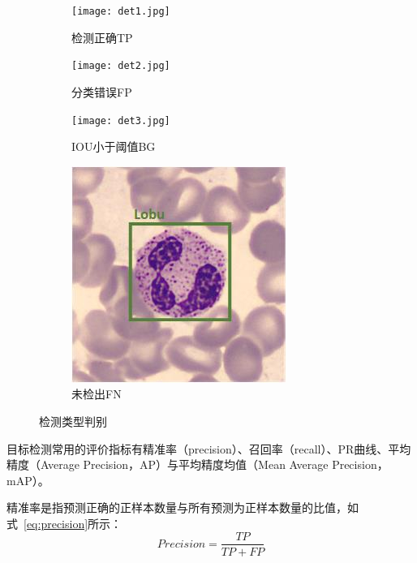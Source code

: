 \begin{figure}[htbp]
	\centering
  \begin{subfigure}{0.24\linewidth}
    \centering
    \texttt{[image: det1.jpg]}
    \caption{检测正确TP}
  \end{subfigure}
	\centering
	\begin{subfigure}{0.24\linewidth}
		\centering
		\texttt{[image: det2.jpg]}
    \caption{分类错误FP}
	\end{subfigure}
	\centering
	\begin{subfigure}{0.24\linewidth}
		\centering
		\texttt{[image: det3.jpg]}
    \caption{IOU小于阈值BG}
	\end{subfigure}
	\centering
	\begin{subfigure}{0.24\linewidth}
		\centering
		\includegraphics[width=0.95\linewidth, height=0.95\linewidth]{det4.jpg}
    \caption{未检出FN}
	\end{subfigure}
	\caption{检测类型判别}
	\label{fig:confusion}
\end{figure}

目标检测常用的评价指标有精准率（precision）、召回率（recall）、PR曲线、平均精度（Average Precision，AP）与平均精度均值（Mean Average Precision，mAP）。

精准率是指预测正确的正样本数量与所有预测为正样本数量的比值，如式~\ref{eq:precision}所示：
\begin{equation}               
  Precision = \frac{TP}{TP + FP}
  \label{eq:precision}     
\end{equation} 

